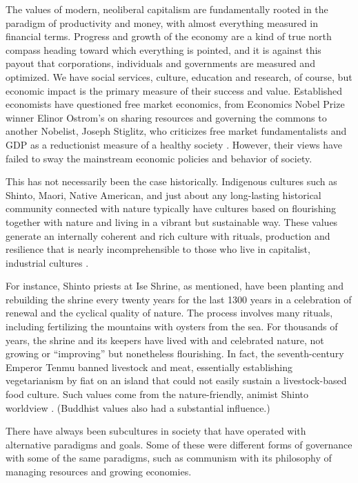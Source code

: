 The values of modern, neoliberal capitalism are fundamentally rooted in the paradigm of productivity and money, with almost everything measured in financial terms. Progress and growth of the economy are a kind of true north compass heading toward which everything is pointed, and it is against this payout that corporations, individuals and governments are measured and optimized. We have social services, culture, education and research, of course, but economic impact is the primary measure of their success and value. Established economists have questioned free market economics, from Economics Nobel Prize winner Elinor Ostrom's on sharing resources and governing the commons \cite{ostrom2015governing} to another Nobelist, Joseph Stiglitz, who criticizes free market fundamentalists and GDP as a reductionist measure of a healthy society \cite{stiglitz2010freefall}. However, their views have failed to sway the mainstream economic policies and behavior of society.

This has not necessarily been the case historically. Indigenous cultures such as Shinto, Maori, Native American, and just about any long-lasting historical community connected with nature typically have cultures based on flourishing together with nature and living in a vibrant but sustainable way. These values generate an internally coherent and rich culture with rituals, production and resilience that is nearly incomprehensible to those who live in capitalist, industrial cultures \cite{kohn2013forests}.

For instance, Shinto priests at Ise Shrine, as mentioned, have been planting and rebuilding the shrine every twenty years for the last 1300 years in a celebration of renewal and the cyclical quality of nature. The process involves many rituals, including fertilizing the mountains with oysters from the sea. For thousands of years, the shrine and its keepers have lived with and celebrated nature, not growing or ``improving'' but nonetheless flourishing. In fact, the seventh-century Emperor Tenmu banned livestock and meat, essentially establishing vegetarianism by fiat on an island that could not easily sustain a livestock-based food culture. Such values come from the nature-friendly, animist Shinto worldview \cite{zenjiro}. (Buddhist values also had a substantial influence.)

There have always been subcultures in society that have operated with alternative paradigms and goals. Some of these were different forms of governance with some of the same paradigms, such as communism with its  philosophy of managing resources and growing economies.

